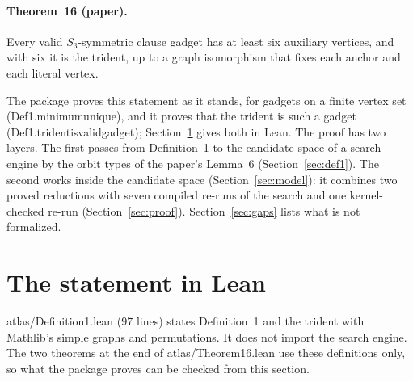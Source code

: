 \documentclass[11pt,a4paper]{article}
\newcommand{\leanus}{\textunderscore\allowbreak}
\newcommand{\lean}[1]{{\ttfamily\let\_\leanus #1}}
\theoremstyle{definition}
\begin{document}
\paragraph{Theorem~16 (paper).} Every valid $S_3$-symmetric clause gadget has
at least six auxiliary vertices, and with six it is the trident, up to a graph
isomorphism that fixes each anchor and each literal vertex.

\medskip
The package proves this statement as it stands, for gadgets on a finite
vertex set (\lean{Def1.minimum\_unique}), and it proves that the trident is
such a gadget (\lean{Def1.trident\_is\_valid\_gadget}); Section~\ref{sec:statement}
gives both in Lean. The proof has two layers. The first passes from
Definition~1 to the candidate space of a search engine by the orbit types of
the paper's Lemma~6 (Section~\ref{sec:def1}). The second works inside the candidate space
(Section~\ref{sec:model}): it combines two proved reductions with seven
compiled re-runs of the search and one kernel-checked re-run
(Section~\ref{sec:proof}). Section~\ref{sec:gaps} lists what is not
formalized.

\section{The statement in Lean}\label{sec:statement}

\lean{atlas/Definition1.lean} (97 lines) states Definition~1 and the trident
with Mathlib's simple graphs and permutations. It does not import the search
engine. The two theorems at the end of \lean{atlas/Theorem16.lean} use these
definitions only, so what the package proves can be checked from this
section.
\end{document}

